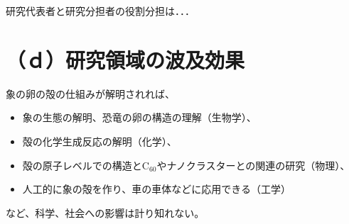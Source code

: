 \documentclass[11pt,a4j,dvipdfmx]{jarticle} 					%
\newcommand{\研究課題名}{象の卵}
\newcommand{\研究機関名}{逢坂大学}
\newcommand{\研究代表者氏名}{湯川秀樹}
\newcommand{\研究期間の最終元号年度}{6}  %
\begin{document}
	研究代表者と研究分担者の役割分担は．．．



\section{（ｄ）研究領域の波及効果}

	象の卵の殻の仕組みが解明されれば、
	\begin{itemize}
		\item 象の生態の解明、恐竜の卵の構造の理解（生物学）、
		\item 殻の化学生成反応の解明（化学）、
		\item 殻の原子レベルでの構造とC$_{60}$やナノクラスターとの関連の研究（物理）、
		\item 人工的に象の殻を作り、車の車体などに応用できる（工学）
	\end{itemize}
	など、科学、社会への影響は計り知れない。	



\end{document}
